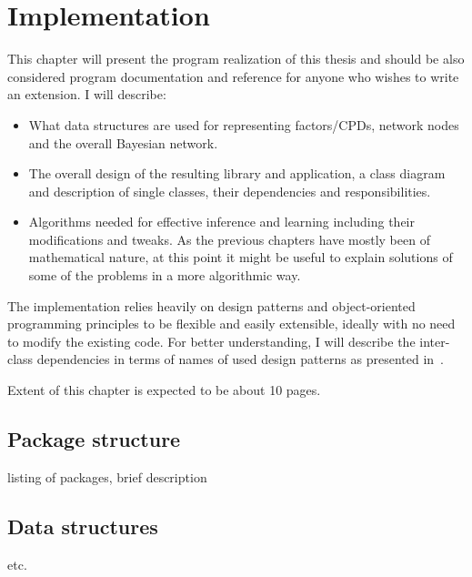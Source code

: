 \documentclass[english,cover]{fitthesis} %
\newcommand{\srccode}[1]{{\tt #1}}         %
\newcommand{\todo}[1]{{\color{red}#1}}
\begin{document}
\chapter{Implementation}
This chapter will present the program realization of this thesis and should be also considered program documentation and reference for anyone who wishes to write an extension. I will describe:
\begin{itemize}
	\item What data structures are used for representing factors/CPDs, network nodes and the overall Bayesian network.
	\item The overall design of the resulting library and \todo{application}, \todo{a class diagram} and description of single classes, their dependencies and responsibilities.
	\item \todo{Algorithms needed for effective inference and learning including their modifications and tweaks. As the previous chapters have mostly been of mathematical nature, at this point it might be useful to explain solutions of some of the problems in a more algorithmic way.}
\end{itemize}
The implementation relies heavily on design patterns and object-oriented programming principles to be flexible and easily extensible, ideally with no need to modify the existing code. For better understanding, I will describe the inter-class dependencies in terms of names of used design patterns as presented in~\cite{head_first_design_patterns}.

\todo{Extent of this chapter is expected to be about 10 pages.}


\section{Package structure}
\todo{listing of packages, brief description}


\section{Data structures}
\todo{\srccode{Variable, Factor, Node, BayesianNetwork} etc.}
\end{document}
